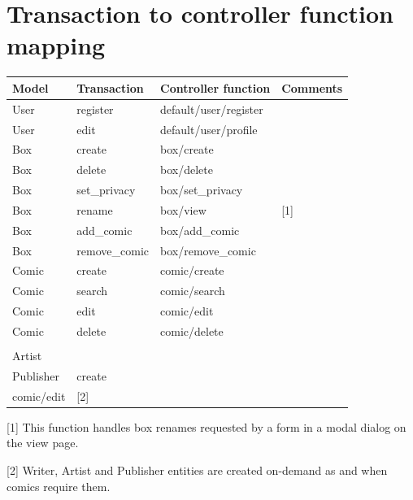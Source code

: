 \documentclass[fontsize=12pt,a4paper]{scrreprt}
\begin{document}
\section{Transaction to controller function mapping}

\begin{tabularx}{\linewidth}{lllX}\toprule
\textbf{Model} & \textbf{Transaction} & \textbf{Controller function} & \textbf{Comments} \\ \hline

User & register & default/user/register &  \\
User & edit & default/user/profile &  \\ \hline

Box & create & box/create &  \\
Box & delete & box/delete &  \\
Box & set\_privacy & box/set\_privacy &  \\
Box & rename & box/view & \textsf{[1]} \\
Box & add\_comic & box/add\_comic &  \\
Box & remove\_comic & box/remove\_comic &  \\ \hline

Comic & create & comic/create &  \\
Comic & search & comic/search &  \\
Comic & edit & comic/edit &  \\
Comic & delete & comic/delete &  \\ \hline

\begin{tabular}[c]{@{}l@{}}Writer\\ Artist\\ Publisher\end{tabular} & create & \begin{tabular}[c]{@{}l@{}}comic/create\\ comic/edit\end{tabular} & \textsf{[2]} \\

\bottomrule
\end{tabularx}

{
  \setlength{\parindent}{0}
  \setlength{\parskip}{0.4em}

  \textsf{[1]} This function handles box renames requested by a form in a modal dialog on the \textsf{view} page.

  \textsf{[2]} \textsf{Writer}, \textsf{Artist} and \textsf{Publisher} entities are created on-demand as and when comics require them.
}
\end{document}
